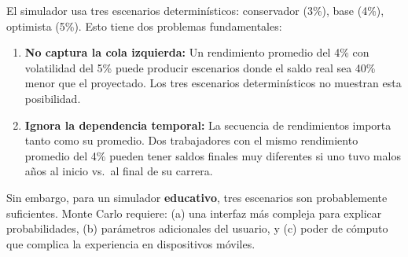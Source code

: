 \documentclass[11pt,a4paper]{report}
\begin{document}
\begin{tcolorbox}[colback=green!5!white, colframe=green!50!black, title=\textbf{Intuici\'on: Por Qu\'e Tres Escenarios No Son Suficientes}]
El simulador usa tres escenarios determin\'isticos: conservador (3\%), base (4\%), optimista (5\%). Esto tiene dos problemas fundamentales:

\begin{enumerate}
  \item \textbf{No captura la cola izquierda:} Un rendimiento promedio del 4\% con volatilidad del 5\% puede producir escenarios donde el saldo real sea 40\% menor que el proyectado. Los tres escenarios determin\'isticos no muestran esta posibilidad.

  \item \textbf{Ignora la dependencia temporal:} La secuencia de rendimientos importa tanto como su promedio. Dos trabajadores con el mismo rendimiento promedio del 4\% pueden tener saldos finales muy diferentes si uno tuvo malos a\~nos al inicio vs.\ al final de su carrera.
\end{enumerate}

Sin embargo, para un simulador \textbf{educativo}, tres escenarios son probablemente suficientes. Monte Carlo requiere: (a) una interfaz m\'as compleja para explicar probabilidades, (b) par\'ametros adicionales del usuario, y (c) poder de c\'omputo que complica la experiencia en dispositivos m\'oviles.
\end{tcolorbox}
\end{document}
